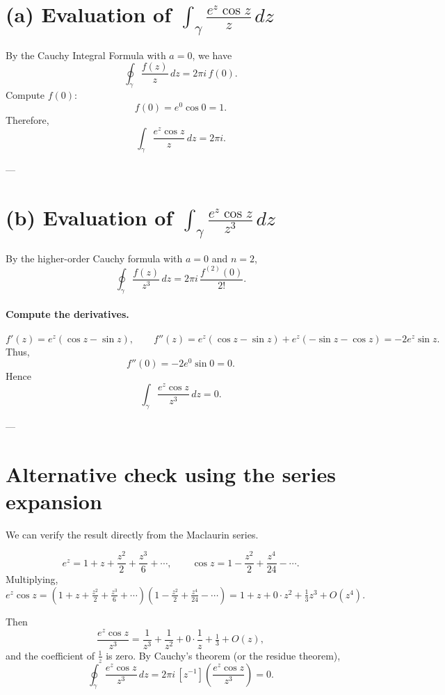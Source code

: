 \documentclass[11pt]{article}
\begin{document}
	\section*{(a) Evaluation of $\displaystyle \int_{\gamma}\frac{e^{z}\cos z}{z}\,dz$}
	
	By the Cauchy Integral Formula with $a=0$, we have
	\[
	\oint_{\gamma}\frac{f(z)}{z}\,dz=2\pi i\,f(0).
	\]
	Compute $f(0)$:
	\[
	f(0)=e^{0}\cos 0=1.
	\]
	Therefore,
	\[
	\boxed{\int_{\gamma}\frac{e^{z}\cos z}{z}\,dz=2\pi i.}
	\]
	
	---
	
	\section*{(b) Evaluation of $\displaystyle \int_{\gamma}\frac{e^{z}\cos z}{z^{3}}\,dz$}
	
	By the higher-order Cauchy formula with $a=0$ and $n=2$,
	\[
	\oint_{\gamma}\frac{f(z)}{z^{3}}\,dz
	=2\pi i\,\frac{f^{(2)}(0)}{2!}.
	\]
	
	\paragraph{Compute the derivatives.}
	\[
	f'(z)=e^{z}(\cos z-\sin z), \qquad
	f''(z)=e^{z}(\cos z-\sin z)+e^{z}(-\sin z-\cos z)=-2e^{z}\sin z.
	\]
	Thus,
	\[
	f''(0)=-2e^{0}\sin 0=0.
	\]
	Hence
	\[
	\boxed{\int_{\gamma}\frac{e^{z}\cos z}{z^{3}}\,dz=0.}
	\]
	
	---
	
	\section*{Alternative check using the series expansion}
	We can verify the result directly from the Maclaurin series.
	
	\[
	e^{z}=1+z+\frac{z^{2}}{2}+\frac{z^{3}}{6}+\cdots,\qquad
	\cos z=1-\frac{z^{2}}{2}+\frac{z^{4}}{24}-\cdots.
	\]
	Multiplying,
	\[
	e^{z}\cos z
	= (1+z+\tfrac{z^{2}}{2}+\tfrac{z^{3}}{6}+\cdots)(1-\tfrac{z^{2}}{2}+\tfrac{z^{4}}{24}-\cdots)
	= 1+z+0\cdot z^{2}+\tfrac{1}{3}z^{3}+O(z^{4}).
	\]
	
	Then
	\[
	\frac{e^{z}\cos z}{z^{3}}
	=\frac{1}{z^{3}}+\frac{1}{z^{2}}+0\cdot\frac{1}{z}+\tfrac{1}{3}+O(z),
	\]
	and the coefficient of $\frac{1}{z}$ is zero.
	By Cauchy’s theorem (or the residue theorem),
	\[
	\oint_{\gamma}\frac{e^{z}\cos z}{z^{3}}\,dz=2\pi i\,[z^{-1}]\!\left(\frac{e^{z}\cos z}{z^{3}}\right)=0.
	\]
	
\end{document}
